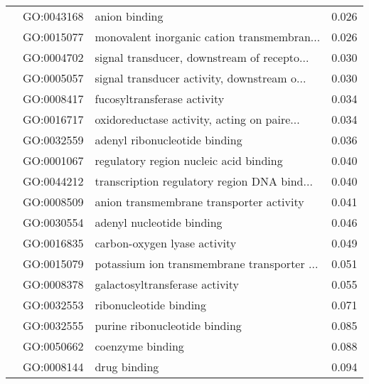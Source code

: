 \begin{longtable}{lllr}
   & GO:0043168 &                                anion binding &         0.026 \\
   & GO:0015077 &  monovalent inorganic cation transmembran... &         0.026 \\
   & GO:0004702 &  signal transducer, downstream of recepto... &         0.030 \\
   & GO:0005057 &  signal transducer activity, downstream o... &         0.030 \\
   & GO:0008417 &                  fucosyltransferase activity &         0.034 \\
   & GO:0016717 &  oxidoreductase activity, acting on paire... &         0.034 \\
   & GO:0032559 &                adenyl ribonucleotide binding &         0.036 \\
   & GO:0001067 &       regulatory region nucleic acid binding &         0.040 \\
   & GO:0044212 &  transcription regulatory region DNA bind... &         0.040 \\
   & GO:0008509 &     anion transmembrane transporter activity &         0.041 \\
   & GO:0030554 &                    adenyl nucleotide binding &         0.046 \\
   & GO:0016835 &                 carbon-oxygen lyase activity &         0.049 \\
   & GO:0015079 &  potassium ion transmembrane transporter ... &         0.051 \\
   & GO:0008378 &               galactosyltransferase activity &         0.055 \\
   & GO:0032553 &                       ribonucleotide binding &         0.071 \\
   & GO:0032555 &                purine ribonucleotide binding &         0.085 \\
   & GO:0050662 &                             coenzyme binding &         0.088 \\
   & GO:0008144 &                                 drug binding &         0.094 \\
\end{longtable}
